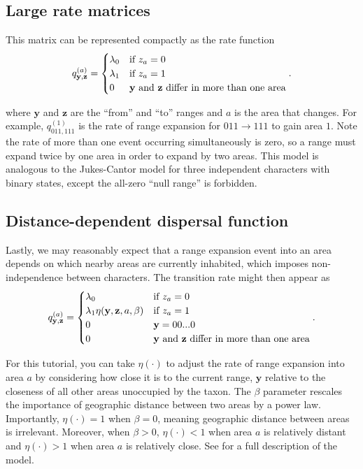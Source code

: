 \subsection{Large rate matrices}

This matrix can be represented compactly as the rate function
\[
q^{(a)}_{\textbf{y},\textbf{z}} =
\begin{cases}
\lambda_0 & \text{if $z_a=0$} \\
\lambda_1 & \text{if $z_a=1$} \\
0 & \text{\textbf{y} and \textbf{z} differ in more than one area}
\end{cases}.
\]

where $\textbf{y}$ and $\textbf{z}$ are the ``from'' and ``to'' ranges and $a$ is the area that changes.
For example, $q^{(1)}_{011,111}$ is the rate of range expansion for $011 \rightarrow 111$ to gain area $1$.
Note the rate of more than one event occurring simultaneously is zero, so a range must expand twice by one area in order to expand by two areas.
This model is analogous to the Jukes-Cantor model for three independent characters with binary states, except the all-zero ``null range'' is forbidden.

\subsection{Distance-dependent dispersal function}

Lastly, we may reasonably expect that a range expansion event into an area depends on which nearby areas are currently inhabited, which imposes non-independence between characters.
The transition rate might then appear as
\[
q^{(a)}_{\textbf{y},\textbf{z}} =
\begin{cases}
\lambda_0 & \text{if $z_a=0$}  \\
\lambda_1 \eta(\textbf{y}, \textbf{z}, a, \beta) & \text{if $z_a=1$} \\
0 & \mathbf{y} = 00...0 \\
0 & \text{\textbf{y} and \textbf{z} differ in more than one area}
\end{cases}.
\]

For this tutorial, you can take $\eta(\cdot)$ to adjust the rate of range expansion into area $a$ by considering how close it is to the current range, $\textbf{y}$ relative to the closeness of all other areas unoccupied by the taxon.
The $\beta$ parameter rescales the importance of geographic distance between two areas by a power law.
Importantly, $\eta(\cdot) = 1$ when $\beta=0$, meaning geographic distance between areas is irrelevant.
Moreover, when $\beta > 0$, $\eta(\cdot) < 1$ when area $a$ is relatively distant and $\eta(\cdot) > 1$ when area $a$ is relatively close.
See \citet{landis13} for a full description of the model.

